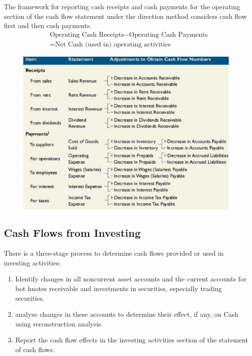 \documentclass[../main.tex]{subfiles}
\begin{document}
	The framework for reporting cash receipts and cash payments for the 
	operating section of the cash flow statement under the direction method 
	considers cash flow first and then cash payments.
	\begin{equation}
	\begin{aligned}
	&\text{Operating Cash Receipts} - \text{Operating Cash Payments} \\&= 
	\text{Net 
	Cash (used in) operating activities}
	\end{aligned}
	\end{equation}
	
	\begin{figure}[ht]
		\centering
		\includegraphics[width=1\columnwidth]{images/c11/direct_eg.png}
	\end{figure}
	
	\subsection{Cash Flows from Investing}
	
	There is a three-stage process to determine cash flows provided or used in 
	investing activities:
	\begin{enumerate}[noitemsep]
		\item Identify changes in all noncurrent asset accounts and the current 
		accounts for bot hnotes receivable and investments in securities, 
		especially trading securities.
		\item analyze changes in these accounts to determine their effect, if 
		any, on Cash using reconstruction analysis.
		\item Report the cash flow effects in the investing activities section 
		of the statement of cash flows.
	\end{enumerate}
	
\end{document}
